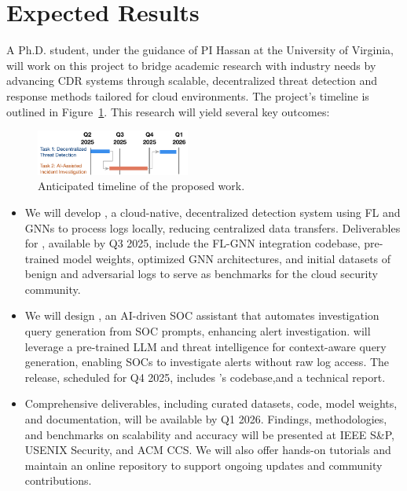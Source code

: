 \section*{Expected Results}

A Ph.D. student, under the guidance of PI Hassan at the University of Virginia, will work on this project to bridge academic research with industry needs by advancing CDR systems through scalable, decentralized threat detection and response methods tailored for cloud environments. The project's timeline is outlined in Figure~\ref{fig:sched}. This research will yield several key outcomes:

\begin{figure}
    \centering \includegraphics[width=0.45\textwidth]{fig/schedule-e2e.pdf}
    \caption{Anticipated timeline of the proposed work.}
    \label{fig:sched}
    \vspace{-2ex}
  \end{figure}

\begin{itemize}[leftmargin=*,noitemsep,topsep=-1pt]
    \item We will develop \Sysa, a cloud-native, decentralized detection system using FL and GNNs to process logs locally, reducing centralized data transfers. Deliverables for \Sysa, available by Q3 2025, include the FL-GNN integration codebase, pre-trained model weights,  optimized GNN architectures, and initial datasets of benign and adversarial logs to serve as benchmarks for the cloud security community.

    \item We will design \Sysb, an AI-driven SOC assistant that automates investigation query generation from SOC prompts, enhancing alert investigation. \Sysb will leverage a pre-trained LLM and threat intelligence for context-aware query generation, enabling SOCs to investigate alerts without raw log access. The release, scheduled for Q4 2025, includes \Sysb's codebase,and a technical report.
    
    \item Comprehensive deliverables, including curated datasets, code, model weights, and documentation, will be available by Q1 2026. Findings, methodologies, and benchmarks on scalability and accuracy will be presented at IEEE S\&P, USENIX Security, and ACM CCS. We will also offer hands-on tutorials and maintain an online repository to support ongoing updates and community contributions.
    
\end{itemize}
    
